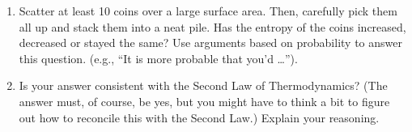 \begin{exercise}
   \begin{enumerate}
   \item Scatter at least 10 coins over a large surface area.  Then,
     carefully pick them all up and stack them into a neat pile.  Has
     the entropy of the coins increased, decreased or stayed the same?
     Use arguments based on probability to answer this question.
     (e.g., ``It is more probable that you'd \dots '').

   \item Is your answer consistent with the Second Law of
     Thermodynamics?  (The answer must, of course, be yes, but you
     might have to think a bit to figure out how to reconcile this
     with the Second Law.)  Explain your reasoning.
   \end{enumerate}
\end{exercise}


